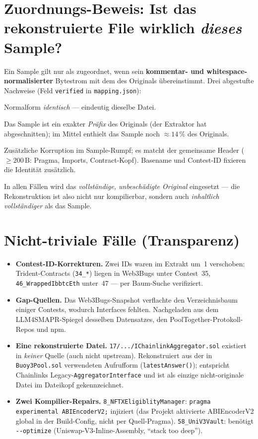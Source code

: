 \documentclass[11pt,a4paper]{scrartcl}
\newcommand{\code}[1]{\texttt{#1}}
\begin{document}
\section{Zuordnungs-Beweis: Ist das rekonstruierte File wirklich \emph{dieses} Sample?}
\label{sec:beweis}

Ein Sample gilt nur als zugeordnet, wenn sein \textbf{kommentar- und
whitespace-normalisierter} Bytestrom mit dem des Originals übereinstimmt. Drei
abgestufte Nachweise (Feld \code{verified} in \code{mapping.json}):

\begin{description}[leftmargin=1.6em,style=nextline]
  \item[\code{equal} (33 Dateien)] Normalform \emph{identisch} --- eindeutig dieselbe Datei.
  \item[\code{truncated-prefix} (50)] Das Sample ist ein exakter \emph{Präfix} des
    Originals (der Extraktor hat abgeschnitten); im Mittel enthielt das Sample noch
    ${\approx}14\,\%$ des Originals.
  \item[\code{header-prefix} (13)] Zusätzliche Korruption im Sample-Rumpf; es matcht
    der gemeinsame Header ($\geq 200$\,B: Pragma, Imports, Contract-Kopf). Basename und
    Contest-ID fixieren die Identität zusätzlich.
\end{description}
\noindent
In allen Fällen wird das \emph{vollständige, unbeschädigte Original} eingesetzt ---
die Rekonstruktion ist also nicht nur kompilierbar, sondern auch \emph{inhaltlich
vollständiger} als das Sample.

\section{Nicht-triviale Fälle (Transparenz)}

\begin{itemize}[leftmargin=1.4em]
  \item \textbf{Contest-ID-Korrekturen.} Zwei IDs waren im Extrakt um~1 verschoben:
    Trident-Contracts (\code{34\_*}) liegen in Web3Bugs unter Contest~35,
    \code{46\_WrappedIbbtcEth} unter~47 --- per Baum-Suche verifiziert.
  \item \textbf{Gap-Quellen.} Das Web3Bugs-Snapshot verflachte den Verzeichnisbaum
    einiger Contests, wodurch Interfaces fehlten. Nachgeladen aus dem LLM4SMAPR-Spiegel
    desselben Datensatzes, den PoolTogether-Protokoll-Repos und npm.
  \item \textbf{Eine rekonstruierte Datei.} \code{17/.../IChainlinkAggregator.sol}
    existiert in \emph{keiner} Quelle (auch nicht upstream). Rekonstruiert aus der in
    \code{Buoy3Pool.sol} verwendeten Aufrufform (\code{latestAnswer()}); entspricht
    Chainlinks Legacy-\code{AggregatorInterface} und ist als einzige nicht-originale
    Datei im Dateikopf gekennzeichnet.
  \item \textbf{Zwei Kompilier-Repairs.} \code{8\_NFTXEligiblityManager}:
    \code{pragma experimental ABIEncoderV2;} injiziert (das Projekt aktivierte
    ABIEncoderV2 global in der Build-Config, nicht per Quell-Pragma).
    \code{58\_UniV3Vault}: benötigt \code{-{}-optimize} (Uniswap-V3-Inline-Assembly,
    \enquote{stack too deep}).
\end{itemize}
\end{document}
